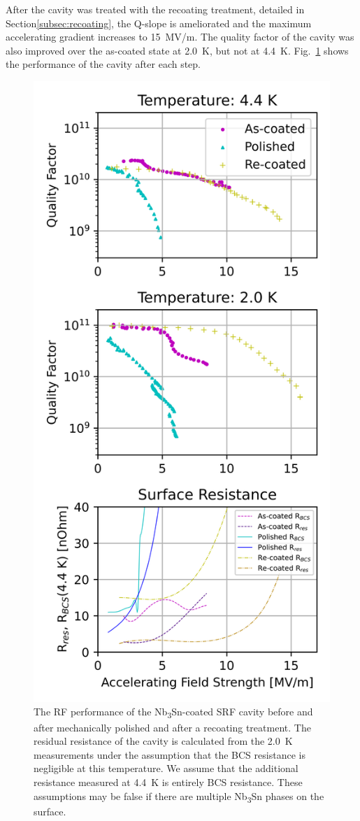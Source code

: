 \documentclass[reprint,amsmath,amssymb,aps]{revtex4-2}%
\begin{document}
After the cavity was treated with the recoating treatment, detailed in Section\ref{subsec:recoating}, the Q-slope is ameliorated and the maximum accelerating gradient increases to 15~MV/m. The quality factor of the cavity was also improved over the as-coated state at 2.0~K, but not at 4.4~K. Fig.~\ref{fig:vtstestgraph} shows the performance of the cavity after each step.
%


\begin{figure}[htb]%
\centering%
\includegraphics[width=0.8\columnwidth]{../doc/figs/VTS_Test_Graph.png}%
\caption{The RF performance of the Nb\textsubscript{3}Sn-coated SRF cavity before and after mechanically polished and after a recoating treatment. The residual resistance of the cavity is calculated from the 2.0~K measurements under the assumption that the BCS resistance is negligible at this temperature. We assume that the additional resistance measured at 4.4~K is entirely BCS resistance. These assumptions may be false if there are multiple Nb\textsubscript{3}Sn phases on the surface.}%
\label{fig:vtstestgraph}%
\end{figure}
\end{document}
